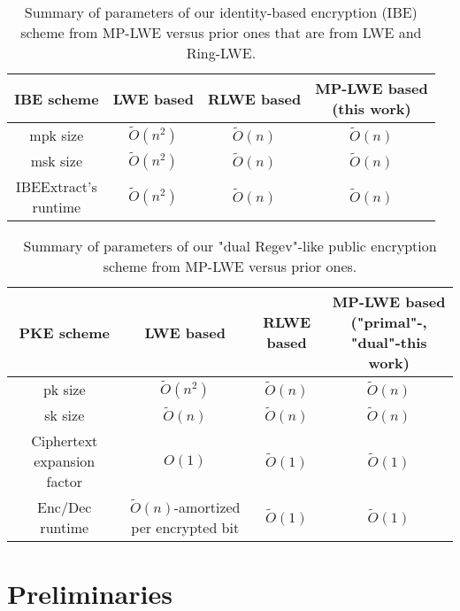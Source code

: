 \documentclass[11pt]{article}
\begin{document}
\begin{table}[h]
    \centering
    \begin{tabular}{|c|c|c|c|}
    \hline
          IBE scheme  & LWE based \autocite{trapdoor} & RLWE based \autocite{} & \makecell{MP-LWE based \\(this work)} \\
         \hline
         mpk size & $\tilde{O}(n^2)$ & $\tilde{O}(n)$ & $\tilde{O}(n)$\\
         \hline
         msk size & $\tilde{O}(n^2)$ & $\tilde{O}(n)$ & $\tilde{O}(n)$\\
         \hline 
        \makecell{IBEExtract's \\
        runtime} & $\tilde{O}(n^2)$ & $\tilde{O}(n)$ & $\tilde{O}(n)$\\
        \hline
    \end{tabular}
    \caption{Summary of parameters of our identity-based encryption (IBE) scheme from MP-LWE versus prior ones that are from LWE and Ring-LWE.}
    \label{tab:ibe-efficiency}
\end{table}

\begin{table}[h!]
    \centering
    \begin{tabular}{|c|c|c|c|}
    \hline
          PKE scheme  & LWE based \autocite{PVW08} & RLWE based \autocite{} &\makecell{MP-LWE based ("primal"-\autocite{MPLWE},\\ "dual"-this work)} \\
         \hline
         pk size & $\tilde{O}(n^2)$ & $\tilde{O}(n)$ & $\tilde{O}(n)$\\
         \hline
         sk size & $\tilde{O}(n)$ & $\tilde{O}(n)$ & $\tilde{O}(n)$\\
         \hline 
        Ciphertext expansion factor & $O(1)$ & $\tilde{O}(1)$ & $\tilde{O}(1)$\\
        \hline
        Enc/Dec runtime & \makecell{$\tilde{O}(n)$-amortized \\ per encrypted bit} & $\tilde{O}(1)$ & $\tilde{O}(1) $\\
        \hline
    \end{tabular}
    \caption{Summary of parameters of our "dual Regev"-like public encryption scheme from MP-LWE versus prior ones.}
    \label{tab:pke-efficiency}
\end{table}

\section{Preliminaries}
\end{document}
